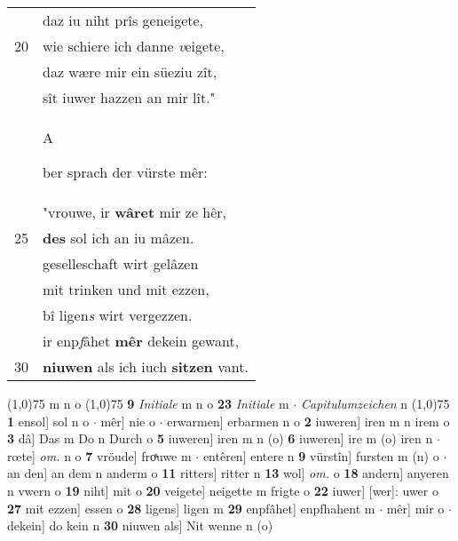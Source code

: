 \documentclass[8pt,a4paper,notitlepage]{article}
\begin{document}
\begin{table}[ht]
\begin{minipage}[t]{0.5\linewidth}
\begin{tabular}{rl}
 & daz iu niht prîs geneigete,\\ 
20 & wie schiere ich danne \textit{v}eigete,\\ 
 & daz wære mir ein süeziu zît,\\ 
 & sît iuwer hazzen an mir lît."\\ 
 & \begin{large}A\end{large}ber sprach der vürste mêr:\\ 
 & "vrouwe, ir \textbf{wâret} mir ze hêr,\\ 
25 & \textbf{des} sol ich an iu mâzen.\\ 
 & geselleschaft wirt gelâzen\\ 
 & mit trinken und mit ezzen,\\ 
 & bî ligen\textit{s} wirt vergezzen.\\ 
 & ir enp\textit{f}âhet \textbf{mêr} dekein gewant,\\ 
30 & \textbf{niuwen} als ich iuch \textbf{sitzen} vant.\\ 
\end{tabular}
\scriptsize
\line(1,0){75} \newline
m n o \newline
\line(1,0){75} \newline
\textbf{9} \textit{Initiale} m n o  \textbf{23} \textit{Initiale} m   $\cdot$ \textit{Capitulumzeichen} n  \newline
\line(1,0){75} \newline
\textbf{1} ensol] sol n o  $\cdot$ mêr] nie o  $\cdot$ erwarmen] erbarmen n o \textbf{2} iuweren] iren m n irem o \textbf{3} dâ] Das m Do n Durch o \textbf{5} iuweren] iren m n (o) \textbf{6} iuweren] ire m (o) iren n  $\cdot$ rœte] \textit{om.} n o \textbf{7} vröude] froͯuwe m  $\cdot$ entêren] entere n \textbf{9} vürstîn] fursten m (n) o  $\cdot$ an den] an dem n anderm o \textbf{11} ritters] ritter n \textbf{13} wol] \textit{om.} o \textbf{18} andern] anyeren n vwern o \textbf{19} niht] mit o \textbf{20} veigete] neigette m frigte o \textbf{22} iuwer] [wer]: uwer o \textbf{27} mit ezzen] essen o \textbf{28} ligens] ligen m \textbf{29} enpfâhet] enpfhahent m  $\cdot$ mêr] mir o  $\cdot$ dekein] do kein n \textbf{30} niuwen als] Nit wenne n (o) \newline
\end{minipage}
\end{table}
\newpage
\end{document}
